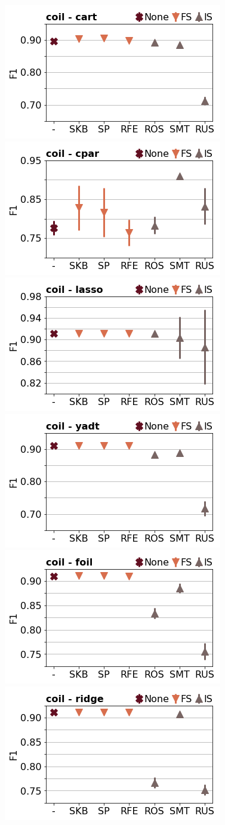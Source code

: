 \documentclass[runningheads,a4paper]{llncs}
\begin{document}
\begin{figure}[!h]
\includegraphics[width=0.32\linewidth]{fig/preps_coil2000_DT_sklearn_f1score.png}
\includegraphics[width=0.32\linewidth]{fig/preps_coil2000_RB_cpar_f1score.png}
\includegraphics[width=0.32\linewidth]{fig/preps_coil2000_LM_lasso_f1score.png}
\includegraphics[width=0.32\linewidth]{fig/preps_coil2000_DT_yadt_f1score.png}
\includegraphics[width=0.32\linewidth]{fig/preps_coil2000_RB_foil_f1score.png}
\includegraphics[width=0.32\linewidth]{fig/preps_coil2000_LM_ridge_f1score.png}
\end{figure}
\end{document}
